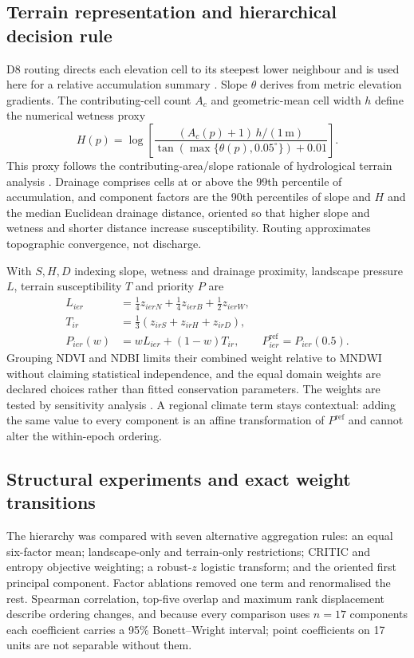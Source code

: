 \subsection{Terrain representation and hierarchical decision rule}
D8 routing directs each elevation cell to its steepest lower neighbour and is used here for a relative accumulation summary \citep{quinn1991flow,tarboton1997flow}. Slope $\theta$ derives from metric elevation gradients. The contributing-cell count $A_c$ and geometric-mean cell width $h$ define the numerical wetness proxy
\begin{equation}\label{eq:wetness}
H(p)=\log\!\left[\frac{(A_c(p)+1)\,h/(1\,\mathrm{m})}
 {\tan(\max\{\theta(p),0.05^\circ\})+0.01}\right].
\end{equation}
This proxy follows the contributing-area/slope rationale of hydrological terrain analysis \citep{beven1979topmodel,moore1991terrain}. Drainage comprises cells at or above the 99th percentile of accumulation, and component factors are the 90th percentiles of slope and $H$ and the median Euclidean drainage distance, oriented so that higher slope and wetness and shorter distance increase susceptibility. Routing approximates topographic convergence, not discharge.

With $S,H,D$ indexing slope, wetness and drainage proximity, landscape pressure $L$, terrain susceptibility $T$ and priority $P$ are
\begin{equation}\label{eq:priority}
\begin{aligned}
L_{ier}&=\tfrac14z_{ierN}+\tfrac14z_{ierB}+\tfrac12z_{ierW},\\
T_{ir}&=\tfrac13(z_{irS}+z_{irH}+z_{irD}),\\
P_{ier}(w)&=wL_{ier}+(1-w)T_{ir},\qquad P_{ier}^{\mathrm{ref}}=P_{ier}(0.5).
\end{aligned}
\end{equation}
Grouping NDVI and NDBI limits their combined weight relative to MNDWI without claiming statistical independence, and the equal domain weights are declared choices rather than fitted conservation parameters. The weights are tested by sensitivity analysis \citep{malczewski2006gis,chen2010sensitivity,feizizadeh2014uncertainty}. A regional climate term stays contextual: adding the same value to every component is an affine transformation of $P^{\mathrm{ref}}$ and cannot alter the within-epoch ordering.

\subsection{Structural experiments and exact weight transitions}
The hierarchy was compared with seven alternative aggregation rules: an equal
six-factor mean; landscape-only and terrain-only restrictions; CRITIC and entropy
objective weighting; a robust-$z$ logistic transform; and the oriented first
principal component. Factor ablations removed one term and renormalised the rest.
Spearman correlation, top-five overlap and maximum rank displacement describe
ordering changes, and because every comparison uses $n=17$ components each
coefficient carries a 95\% Bonett--Wright interval; point coefficients on 17 units
are not separable without them.

